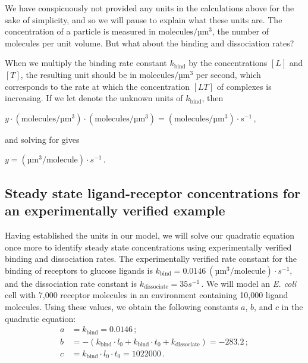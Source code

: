 We have conspicuously not provided any units in the calculations above for the sake of simplicity, and so we will pause to explain what these units are. The concentration of a particle is measured in $\text{molecules}/\text{µm}^3$, the number of molecules per unit volume. But what about the binding and dissociation rates?

When we multiply the binding rate constant $k_\text{bind}$ by the concentrations $[L]$ and $[T]$, the resulting unit should be in $\text{molecules}/\text{µm}^3$ per second, which corresponds to the rate at which the concentration $[LT]$ of complexes is increasing. If we let  denote the unknown units of $k_\text{bind}$, then

\begin{center}
$y \cdot (\text{molecules}/\text{µm}^3) \cdot (\text{molecules}/\text{µm}^3) = (\text{molecules}/\text{µm}^3) \cdot s^{-1}$\,,
\end{center}

\noindent and solving for  gives

\begin{center}
$y = (\text{µm}^3/\text{molecule}) \cdot s^{-1}$\,.
\end{center}

\fudgespace

\begin{qbox}\end{qbox}

\FloatBarrier
{}
\subsection{Steady state ligand-receptor concentrations for an experimentally verified example}

Having established the units in our model, we will solve our quadratic equation once more to identify steady state concentrations using experimentally verified binding and dissociation rates. The experimentally verified rate constant for the binding of receptors to glucose ligands is $k_\text{bind} = 0.0146~(\text{µm}^3/\text{molecule}) \cdot s^{-1}$, and the dissociation rate constant is $k_\text{dissociate} = 35s^{-1}$\,. We will model an \textit{E. coli} cell with 7,000 receptor molecules in an environment containing 10,000 ligand molecules. Using these values, we obtain the following constants $a$, $b$, and $c$ in the quadratic equation:
\begin{align*}
a & = k_\text{bind} = 0.0146\,;\\
b & = - (k_\text{bind} \cdot l_0 + k_\text{bind} \cdot t_0 + k_\text{dissociate}) = -283.2\,;\\
c & = k_\text{bind} \cdot l_0 \cdot t_0 = 1022000\,.
\end{align*}


